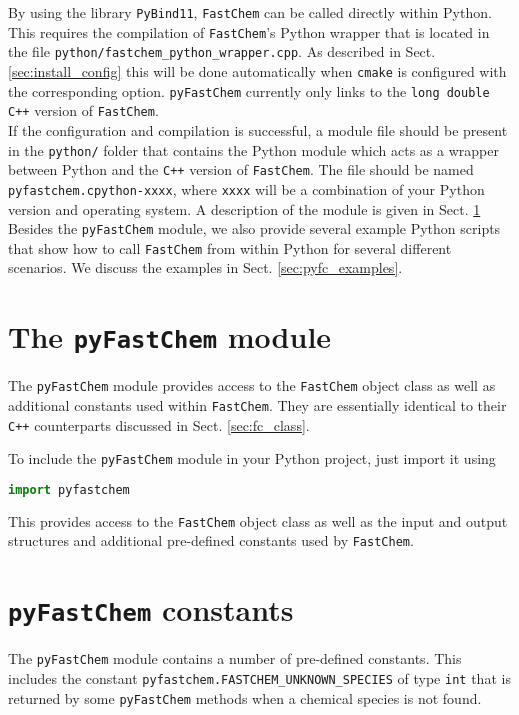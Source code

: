 \documentclass[numbers=noenddot]{fcmanual}
\newcommand{\fc}{\texttt{FastChem}\xspace}
\newcommand{\pfc}{\texttt{pyFastChem}\xspace}
\newcommand{\cpp}{\ttt{C++}\xspace}
\newcommand{\pb}{\texttt{PyBind11}\xspace}
\newcommand{\ttt}[1]{\texttt {#1}}
\begin{document}
By using the library \pb, \fc can be called directly within Python. This requires the compilation of \fc's Python wrapper that is located in the file \verb|python/fastchem_python_wrapper.cpp|. As described in Sect. \ref{sec:install_config} this will be done automatically when \ttt{cmake} is configured with the corresponding option. \pfc currently only links to the \lstinline!long double! \cpp version of \fc. \\
If the configuration and compilation is successful, a module file should be present in the \verb|python/| folder that contains the Python module which acts as a wrapper between Python and the \cpp version of \fc. The file should be named \verb|pyfastchem.cpython-xxxx|, where \verb|xxxx| will be a combination of your Python version and operating system. A description of the module is given in Sect. \ref{sec:pyfc_module} Besides the \pfc module, we also provide several example Python scripts that show how to call \fc from within Python for several different scenarios. We discuss the examples in Sect. \ref{sec:pyfc_examples}.


\section{The \pfc module}
\label{sec:pyfc_module}

The \pfc module provides access to the \fc object class as well as additional constants used within \fc. They are essentially identical to their \cpp counterparts discussed in Sect. \ref{sec:fc_class}.

To include the \pfc module in your Python project, just import it using

\begin{lstlisting}[language=Python]
  import pyfastchem
\end{lstlisting}

This provides access to the \fc object class as well as the input and output structures and additional pre-defined constants used by \fc.

\section{\pfc constants}
\label{sec:pfc_constants}

The \pfc module contains a number of pre-defined constants. This includes the constant \lstinline!pyfastchem.FASTCHEM_UNKNOWN_SPECIES! of type \lstinline!int! that is returned by some \pfc methods when a chemical species is not found. \\
\end{document}
